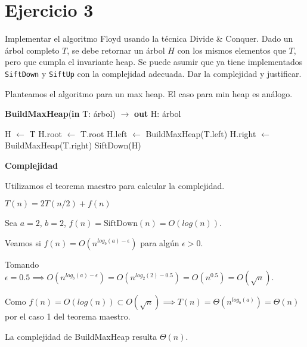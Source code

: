 \section{Ejercicio 3}

Implementar el algoritmo Floyd usando la técnica Divide \& Conquer. Dado un árbol completo $T$, se debe retornar un árbol $H$ con los mismos elementos que $T$, pero que cumpla el invariante heap. Se puede asumir que ya tiene implementados \lstinline{SiftDown} y \lstinline{SiftUp} con la complejidad adecuada. Dar la complejidad y justificar.

Planteamos el algoritmo para un max heap. El caso para min heap es análogo.

\begin{algorithm}[H]
\caption{
    \textbf{BuildMaxHeap}(\textbf{in} T: árbol) $\to$ \textbf{out} H: árbol
}
\begin{algorithmic}[1]
        \State H $\gets$ T 
    \Else
        \State H.root $\gets$ T.root
        \State H.left $\gets$ BuildMaxHeap(T.left)
        \State H.right $\gets$ BuildMaxHeap(T.right)
        \State SiftDown(H) 
    \EndIf
\end{algorithmic}
\end{algorithm}

\textbf{Complejidad}

Utilizamos el teorema maestro para calcular la complejidad.

$T(n) = 2T(n/2) + f(n)$

Sea $a=2$, $b=2$, $f(n) = \text{SiftDown}(n) = O(log(n))$.

Veamos si $f(n) = O(n^{log_b(a) - \epsilon})$ para algún $\epsilon > 0$.

Tomando $\epsilon = 0.5 \implies O(n^{log_b(a) - \epsilon}) = O(n^{log_2(2) - 0.5}) = O(n^{0.5}) = O(\sqrt{n})$.

Como $f(n) = O(log(n)) \subset O(\sqrt{n}) \implies T(n) = \Theta(n^{log_b(a)}) = \Theta(n)$ por el caso 1 del teorema maestro.

La complejidad de BuildMaxHeap resulta $\Theta(n)$.
